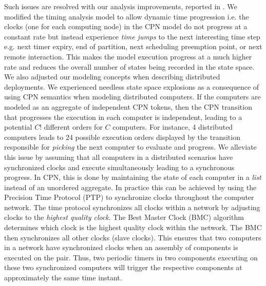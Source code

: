 Such issues are resolved with our analysis improvements, reported in \cite{SEUS}. We modified the timing analysis model to allow dynamic time progression i.e. the clocks (one for each computing node) in the CPN model do not progress at a constant rate but instead experience \emph{time jumps} to the next interesting time step e.g. next timer expiry, end of partition, next scheduling preemption point, or next remote interaction. This makes the model execution progress at a much higher rate and reduces the overall number of states being recorded in the state space. We also adjusted our modeling concepts when describing distributed deployments. We experienced needless state space explosions as a consequence of using CPN semantics when modeling distributed computers. If the computers are modeled as an aggregate of independent CPN tokens, then the CPN transition that progresses the execution in each computer is independent, leading to a potential $C!$ different orders for $C$ computers. For instance, 4 distributed computers leads to 24 possible execution orders displayed by the transition responsible for \emph{picking} the next computer to evaluate and progress. We alleviate this issue by assuming that all computers in a distributed scenarios have synchronized clocks and execute simultaneously leading to a synchronous progress. In CPN, this is done by maintaining the state of each computer in a \emph{list} instead of an unordered aggregate. In practice this can be achieved by using the Precision Time Protocol (PTP) \cite{correll2005design} to synchronize clocks throughout the computer network. The time protocol synchronizes all clocks within a network by adjusting clocks to the \emph{highest quality clock}. The Best Master Clock (BMC) algorithm determines which clock is the highest quality clock within the network. The BMC then synchronizes all other clocks (slave clocks). This ensures that two computers in a network have synchronized clocks when an assembly of components is executed on the pair. Thus, two periodic timers in two components executing on these two synchronized computers will trigger the respective components at approximately the same time instant. 



